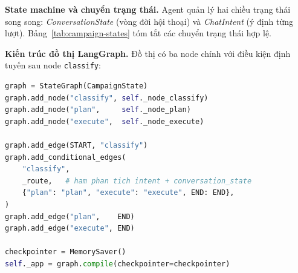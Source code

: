 \textbf{State machine và chuyển trạng thái.} Agent quản lý hai chiều
trạng thái song song: \emph{ConversationState} (vòng đời hội thoại) và
\emph{ChatIntent} (ý định từng lượt). Bảng~\ref{tab:campaign-states}
tóm tắt các chuyển trạng thái hợp lệ.

\begin{table}[htbp]
  \centering
  \small
  \caption{Chuyển trạng thái hội thoại trong CampaignAgent.}
  \label{tab:campaign-states}
\end{table}

\textbf{Kiến trúc đồ thị LangGraph.} Đồ thị có ba node chính với
điều kiện định tuyến sau node \texttt{classify}:

\begin{lstlisting}[language=Python, caption={Cấu trúc đồ thị CampaignAgent (rút gọn).}]
graph = StateGraph(CampaignState)
graph.add_node("classify", self._node_classify)
graph.add_node("plan",     self._node_plan)
graph.add_node("execute",  self._node_execute)

graph.add_edge(START, "classify")
graph.add_conditional_edges(
    "classify",
    _route,   # ham phan tich intent + conversation_state
    {"plan": "plan", "execute": "execute", END: END},
)
graph.add_edge("plan",    END)
graph.add_edge("execute", END)

checkpointer = MemorySaver()
self._app = graph.compile(checkpointer=checkpointer)
\end{lstlisting}

